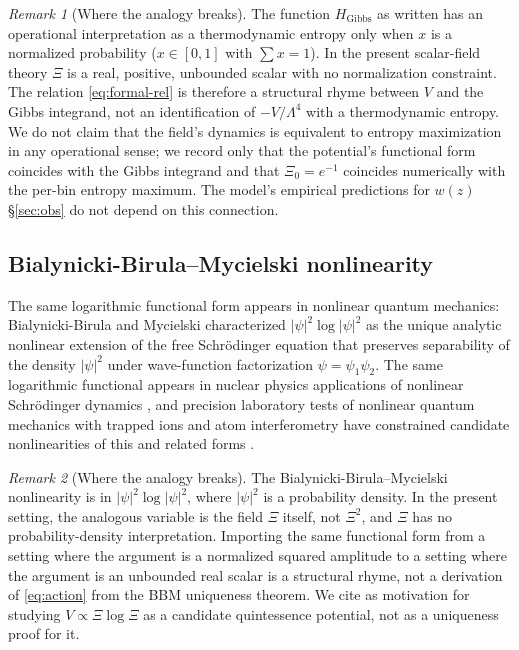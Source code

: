 \documentclass[11pt,reqno]{amsart}
\theoremstyle{plain}
\theoremstyle{definition}
\theoremstyle{remark}
\newtheorem*{remark}{Remark}
\newcommand{\Gibbs}{\mathrm{Gibbs}}
\begin{document}
\begin{remark}[Where the analogy breaks]
The function $H_{\Gibbs}$ as written has an operational interpretation
as a thermodynamic entropy only when $x$ is a normalized probability
($x \in [0,1]$ with $\sum x = 1$). In the present scalar-field theory
$\Xi$ is a real, positive, unbounded scalar with no normalization
constraint. The relation \eqref{eq:formal-rel} is therefore a
structural rhyme between $V$ and the Gibbs integrand, not an
identification of $-V/\Lambda^{4}$ with a thermodynamic entropy.
We do not claim that the field's dynamics is equivalent to entropy
maximization in any operational sense; we record only that the
potential's functional form coincides with the Gibbs integrand and
that $\Xi_0 = e^{-1}$ coincides numerically with the per-bin
entropy maximum. The model's empirical predictions for $w(z)$
\S\ref{sec:obs} do not depend on this connection.
\end{remark}

\subsection{Bialynicki-Birula--Mycielski nonlinearity}

The same logarithmic functional form appears in nonlinear quantum
mechanics: Bialynicki-Birula and Mycielski
\cite{BialynickiBirulaMycielski1976} characterized
$|\psi|^{2} \log |\psi|^{2}$ as the unique analytic nonlinear extension
of the free Schr\"odinger equation that preserves separability of the
density $|\psi|^{2}$ under wave-function factorization
$\psi = \psi_1 \psi_2$. The same logarithmic functional appears in
nuclear physics applications of nonlinear Schr\"odinger dynamics
\cite{Hefter1985}, and precision laboratory tests of nonlinear quantum
mechanics with trapped ions and atom interferometry have constrained
candidate nonlinearities of this and related forms
\cite{Weinberg1989Precision,Bollinger1989}.

\begin{remark}[Where the analogy breaks]
The Bialynicki-Birula--Mycielski nonlinearity is in
$|\psi|^{2}\log|\psi|^{2}$, where $|\psi|^{2}$ is a probability density.
In the present setting, the analogous variable is the field $\Xi$
itself, not $\Xi^{2}$, and $\Xi$ has no probability-density
interpretation. Importing the same functional form from a setting
where the argument is a normalized squared amplitude to a setting where
the argument is an unbounded real scalar is a structural rhyme, not a
derivation of \eqref{eq:action} from the BBM uniqueness theorem. We
cite \cite{BialynickiBirulaMycielski1976,Rosen1969,CazenaveHaraux1980,HoeghKrohn1971}
as motivation for studying $V \propto \Xi\log\Xi$ as a candidate
quintessence potential, not as a uniqueness proof for it.
\end{remark}
\end{document}
